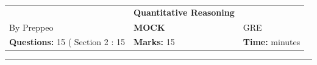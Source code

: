 \documentclass[11pt,paper=a4,answers]{exam}
\begin{document}
\begin{center}
    \centering
    \renewcommand{\arraystretch}{1.5}
    \begin{tabularx}{\textwidth}{YYY}
    & \normalsize\bf{{\Large{{Quantitative Reasoning}}}} & \\
    By Preppeo & \normalsize\bf{MOCK } & GRE\\
    \normalsize{\textbf{Questions:} 15 ( Section 2 : 15} & \normalsize{\textbf{Marks:} 15 } & \normalsize{\textbf{Time:}  minutes } \\
    \end{tabularx}
\end{center}
\par\noindent\rule{\textwidth}{1pt}
\end{document}
